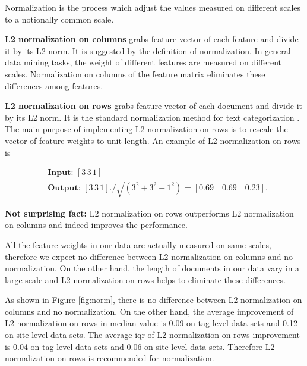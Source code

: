 \documentclass{sig-alternate-05-2015}
\begin{document}
Normalization is the process which adjust the values measured on different scales to a notionally common scale.

\textbf{L2 normalization on columns} grabs feature vector of each feature and divide it by its L2 norm. It is suggested by the definition of normalization. In general data mining tasks, the weight of different features are measured on different scales. Normalization on columns of the feature matrix eliminates these differences among features.

\textbf{L2 normalization on rows} grabs feature vector of each document and divide it by its L2 norm. It is the standard normalization method for text categorization \cite{frank2006naive}. The main purpose of implementing L2 normalization on rows is to rescale the vector of feature weights to unit length. An example of L2 normalization on rows is

\begin{equation*}
\begin{aligned}
    &\textbf{Input: }[3 \, 3 \, 1]\\
    &\textbf{Output: }[3 \, 3 \, 1]./\sqrt{(3^2+3^2+1^2)}=[0.69 \quad 0.69 \quad 0.23].
\end{aligned}
\end{equation*}


\textbf{Not surprising fact:} L2 normalization on rows outperforms L2 normalization on columns and indeed improves the performance.

All the feature weights in our data are actually measured on same scales, therefore we expect no difference between L2 normalization on columns and no normalization. On the other hand, the length of documents in our data vary in a large scale and L2 normalization on rows helps to eliminate these differences.

As shown in Figure \ref{fig:norm}, there is no difference between L2 normalization on columns and no normalization. On the other hand, the average improvement of L2 normalization on rows in median value is 0.09 on tag-level data sets and 0.12 on site-level data sets. The average iqr of L2 normalization on rows improvement is 0.04 on tag-level data sets and 0.06 on site-level data sets. Therefore L2 normalization on rows is recommended for normalization.
\end{document}
